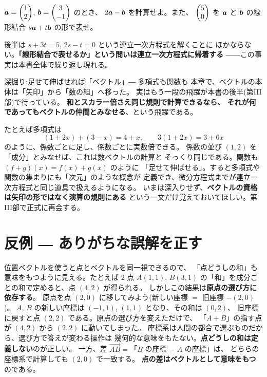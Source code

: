 \begin{mondai}\label{q:vec}     %
$\bm{a} = \begin{pmatrix}1 \\ 2\end{pmatrix}$, $\bm{b} = \begin{pmatrix}3 \\ -1\end{pmatrix}$ のとき、
$2\bm{a} - \bm{b}$ を計算せよ。また、
$\begin{pmatrix}5 \\ 0\end{pmatrix}$ を $\bm{a}$ と $\bm{b}$ の線形結合
$s\bm{a} + t\bm{b}$ の形で表せ。
\end{mondai}

後半は $s + 3t = 5$, $2s - t = 0$ という連立一次方程式を解くことに
ほかならない。\textbf{「線形結合で表せるか」という問いは連立一次方程式に帰着する}
――この事実は本書全体で繰り返し現れる。

\begin{itembox}[l]{深掘り:足せて伸ばせれば「ベクトル」― 多項式も関数も}
本章で、ベクトルの本体は「矢印」から「数の組」へ移った。
実はもう一段の飛躍が本書の後半(第III部)で待っている。
\textbf{和とスカラー倍さえ同じ規則で計算できるなら、
それが何であってもベクトルの仲間とみなせる}、という飛躍である。

たとえば多項式は
\[
(1 + 2x) + (3 - x) = 4 + x, \qquad 3(1 + 2x) = 3 + 6x
\]
のように、係数ごとに足し、係数ごとに実数倍できる。
係数の並び $(1, 2)$ を「成分」とみなせば、これは数ベクトルの計算と
そっくり同じである。関数も $(f + g)(x) = f(x) + g(x)$ のように
「足せて伸ばせる」。すると多項式や関数の集まりにも「次元」のような概念が
定義でき、微分方程式までが連立一次方程式と同じ道具で扱えるようになる。
いまは深入りせず、\textbf{ベクトルの資格は矢印の形ではなく演算の規則にある}
という一文だけ覚えておいてほしい。第III部で正式に再会する。
\end{itembox}

\section{反例 ― ありがちな誤解を正す}

\begin{hanrei}[点どうしは足せない]\label{hanrei:pointsum}
位置ベクトルを使うと点とベクトルを同一視できるので、
「点どうしの和」も意味をもつように見える。たとえば $2$ 点 $A(1, 1)$,
$B(3, 1)$ の「和」を成分ごとの和で定めると、点 $(4, 2)$ が得られる。
しかしこの結果は\textbf{原点の選び方に依存する}。
原点を点 $(2, 0)$ に移してみよう(新しい座標 $=$ 旧座標 $- (2, 0)$)。
$A$, $B$ の新しい座標は $(-1, 1)$, $(1, 1)$ となり、その和は $(0, 2)$、
旧座標に戻すと点 $(2, 2)$ である。原点の選び方を変えただけで、
「$A + B$」の指す点が $(4, 2)$ から $(2, 2)$ に動いてしまった。
座標系は人間の都合で選ぶものだから、選び方で答えが変わる操作は
幾何的な意味をもたない。\textbf{点どうしの和は定義しない}のが正しい。
一方、差 $\overrightarrow{AB} = $「$B$ の座標 $-$ $A$ の座標」は、
どちらの座標系で計算しても $(2, 0)$ で一致する。
\textbf{点の差はベクトルとして意味をもつ}のである。
\end{hanrei}

